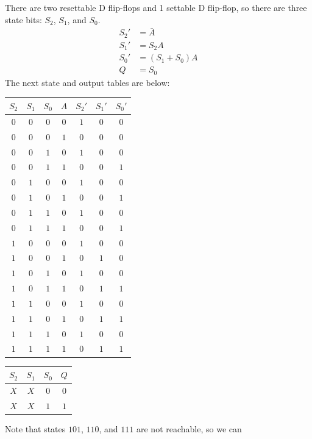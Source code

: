 \documentclass[12pt]{article}
\newenvironment{sol}[1][Solution]{\begin{trivlist}
		\item[\hskip \labelsep {\bfseries #1:}]}{\end{trivlist}}
\begin{document}
\begin{sol}
	There are two resettable D flip-flops and 1 settable
	D flip-flop, so there are three state bits: $S_2$, $S_1$,
	and $S_0$.
	\begin{align*}
		S_2'&=\bar{A}\\
		S_1'&=S_2A\\
		S_0'&=(S_1+S_0)A\\
		Q&=S_0
	\end{align*}
	The next state and output tables are below:
	\begin{center}
		\begin{tabular}{ccc|c|ccc}
			$S_2$ & $S_1$ & $S_0$ & $A$ & $S_2'$ & $S_1'$ & $S_0'$\\
			\hline
			$0$ & $0$ & $0$ & $0$ & $1$ & $0$ & $0$\\
			$0$ & $0$ & $0$ & $1$ & $0$ & $0$ & $0$\\
			$0$ & $0$ & $1$ & $0$ & $1$ & $0$ & $0$\\
			$0$ & $0$ & $1$ & $1$ & $0$ & $0$ & $1$\\
			$0$ & $1$ & $0$ & $0$ & $1$ & $0$ & $0$\\
			$0$ & $1$ & $0$ & $1$ & $0$ & $0$ & $1$\\
			$0$ & $1$ & $1$ & $0$ & $1$ & $0$ & $0$\\
			$0$ & $1$ & $1$ & $1$ & $0$ & $0$ & $1$\\
			$1$ & $0$ & $0$ & $0$ & $1$ & $0$ & $0$\\
			$1$ & $0$ & $0$ & $1$ & $0$ & $1$ & $0$\\
			$1$ & $0$ & $1$ & $0$ & $1$ & $0$ & $0$\\
			$1$ & $0$ & $1$ & $1$ & $0$ & $1$ & $1$\\
			$1$ & $1$ & $0$ & $0$ & $1$ & $0$ & $0$\\
			$1$ & $1$ & $0$ & $1$ & $0$ & $1$ & $1$\\
			$1$ & $1$ & $1$ & $0$ & $1$ & $0$ & $0$\\
			$1$ & $1$ & $1$ & $1$ & $0$ & $1$ & $1$\\
		\end{tabular}
		\quad
		\begin{tabular}{ccc|c}
			$S_2$ & $S_1$ & $S_0$ & $Q$\\
			\hline
			$X$ & $X$ & $0$ & $0$\\
			$X$ & $X$ & $1$ & $1$\\
		\end{tabular}
	\end{center}
	Note that states $101$, $110$, and $111$ are not reachable, so we can

\end{sol}
\end{document}
